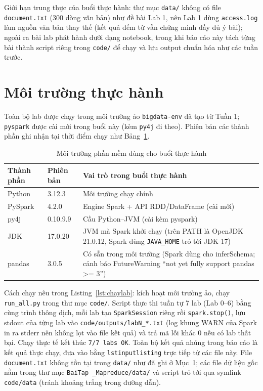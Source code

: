 \documentclass[12pt,a4paper,oneside]{article}
\begin{document}
Giới hạn trung thực của buổi thực hành: thư mục \texttt{data/} không có file \texttt{document.txt} (300 dòng văn bản) như đề bài Lab 1, nên Lab 1 dùng \texttt{access.log} làm nguồn văn bản thay thế (kết quả đếm từ vẫn chứng minh đầy đủ ý bài); ngoài ra bài lab phát hành dưới dạng notebook, trong khi báo cáo này tách từng bài thành script riêng trong \texttt{code/} để chạy và lưu output chuẩn hóa như các tuần trước.

\section{Môi trường thực hành}

Toàn bộ lab được chạy trong môi trường ảo \texttt{bigdata-env} đã tạo từ Tuần 1; \texttt{pyspark} được cài mới trong buổi này (kèm \texttt{py4j} đi theo). Phiên bản các thành phần ghi nhận tại thời điểm chạy như Bảng~\ref{tab:env}.

\begin{table}[H]
\centering
\caption{Môi trường phần mềm dùng cho buổi thực hành}
\label{tab:env}
\begin{tabularx}{\textwidth}{l l X}
\toprule
Thành phần & Phiên bản & Vai trò trong buổi thực hành \\
\midrule
Python & 3.12.3 & Môi trường chạy chính \\
PySpark & 4.2.0 & Engine Spark + API RDD/DataFrame (cài mới) \\
py4j & 0.10.9.9 & Cầu Python--JVM (cài kèm pyspark) \\
JDK & 17.0.20 & JVM mà Spark khởi chạy (trên PATH là OpenJDK 21.0.12, Spark dùng \texttt{JAVA\_HOME} trỏ tới JDK 17) \\
pandas & 3.0.5 & Có sẵn trong môi trường (Spark dùng cho inferSchema; cảnh báo FutureWarning ``not yet fully support pandas >= 3'') \\
\bottomrule
\end{tabularx}
\end{table}

Cách chạy nêu trong Listing~\ref{lst:chaylab}: kích hoạt môi trường ảo, chạy \texttt{run\_all.py} trong thư mục \texttt{code/}. Script thực thi tuần tự 7 lab (Lab 0--6) bằng cùng trình thông dịch, mỗi lab tạo \texttt{SparkSession} riêng rồi \texttt{spark.stop()}, lưu stdout của từng lab vào \texttt{code/outputs/labN\_*.txt} (log khung WARN của Spark in ra stderr nên không lọt vào file kết quả) và trả mã lỗi khác 0 nếu có lab thất bại. Chạy thực tế kết thúc \texttt{7/7 labs OK}. Toàn bộ kết quả nhúng trong báo cáo là kết quả thực chạy, đưa vào bằng \texttt{lstinputlisting} trực tiếp từ các file này. File \texttt{document.txt} không tồn tại trong \texttt{data/} như đã ghi ở Mục~1; các file dữ liệu gốc nằm trong thư mục \texttt{BaiTap \_Mapreduce/data/} và script trỏ tới qua symlink \texttt{code/data} (tránh khoảng trắng trong đường dẫn).
\end{document}
